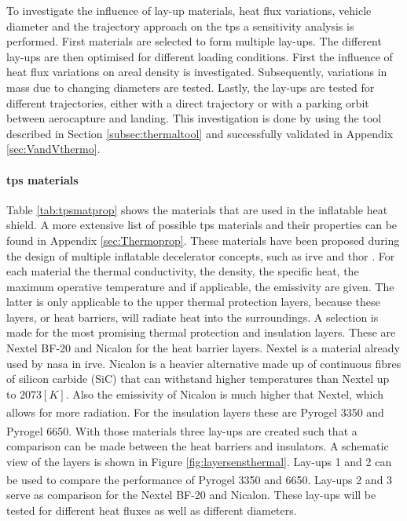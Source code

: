 To investigate the influence of lay-up materials, heat flux variations, vehicle diameter and the trajectory approach on the \gls{tps} a sensitivity analysis is performed. First materials are selected to form multiple lay-ups. The different lay-ups are then optimised for different loading conditions. First the influence of heat flux variations on areal density is investigated. Subsequently, variations in mass due to changing diameters are tested. Lastly, the lay-ups are tested for different trajectories, either with a direct trajectory or with a parking orbit between aerocapture and landing. This investigation is done by using the tool described in Section \ref{subsec:thermaltool} and successfully validated in Appendix \ref{sec:VandVthermo}.

\paragraph{\gls{tps} materials}
Table \ref{tab:tpsmatprop} shows the materials that are used in the inflatable heat shield. A more extensive list of possible \gls{tps} materials and their properties can be found in Appendix \ref{sec:Thermoprop}. These materials have been proposed during the design of multiple inflatable decelerator concepts, such as \gls{irve} and \gls{thor} \cite{Hughes2005}. For each material the thermal conductivity, the density, the specific heat, the maximum operative temperature and if applicable, the emissivity are given. The latter is only applicable to the upper thermal protection layers, because these layers, or heat barriers, will radiate heat into the surroundings.
\newline\newline
A selection is made for the most promising thermal protection and insulation layers. These are Nextel BF-20 and Nicalon for the heat barrier layers. Nextel is a material already used by \gls{nasa} in \gls{irve}. Nicalon is a heavier alternative made up of continuous fibres of silicon carbide (SiC) that can withstand higher temperatures than Nextel up to $2073 \left[K\right]$. Also the emissivity of Nicalon is much higher that Nextel, which allows for more radiation. For the insulation layers these are Pyrogel\textsuperscript{\textregistered} 3350 and Pyrogel\textsuperscript{\textregistered} 6650. With those materials three lay-ups are created such that a comparison can be made between the heat barriers and insulators. A schematic view of the layers is shown in Figure \ref{fig:layersensthermal}. Lay-ups 1 and 2 can be used to compare the performance of Pyrogel\textsuperscript{\textregistered} 3350 and 6650. Lay-ups 2 and 3 serve as comparison for the Nextel BF-20 and Nicalon. These lay-ups will be tested for different heat fluxes as well as different diameters.


